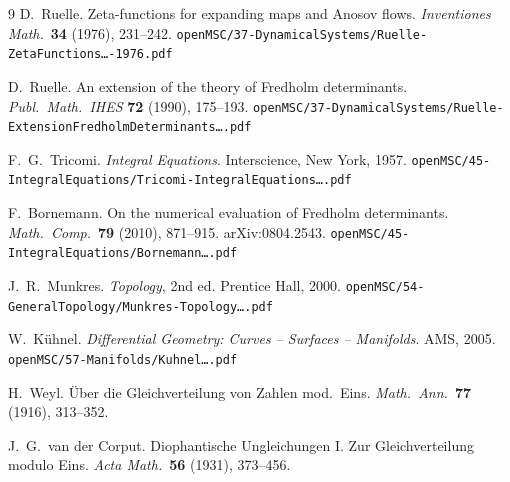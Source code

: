\documentclass[
]{article}
\begin{document}
\begin{thebibliography}{9}
D.~Ruelle.
Zeta-functions for expanding maps and Anosov flows.
\textit{Inventiones Math.}\ \textbf{34} (1976), 231--242.
\texttt{openMSC/37-DynamicalSystems/Ruelle-ZetaFunctions\ldots-1976.pdf}

D.~Ruelle.
An extension of the theory of Fredholm determinants.
\textit{Publ.\ Math.\ IHES} \textbf{72} (1990), 175--193.
\texttt{openMSC/37-DynamicalSystems/Ruelle-ExtensionFredholmDeterminants\ldots.pdf}

F.~G.~Tricomi.
\textit{Integral Equations}.
Interscience, New York, 1957.
\texttt{openMSC/45-IntegralEquations/Tricomi-IntegralEquations\ldots.pdf}

F.~Bornemann.
On the numerical evaluation of Fredholm determinants.
\textit{Math.\ Comp.}\ \textbf{79} (2010), 871--915.
arXiv:0804.2543.
\texttt{openMSC/45-IntegralEquations/Bornemann\ldots.pdf}

J.~R.~Munkres.
\textit{Topology}, 2nd ed.
Prentice Hall, 2000.
\texttt{openMSC/54-GeneralTopology/Munkres-Topology\ldots.pdf}

W.~K\"uhnel.
\textit{Differential Geometry: Curves -- Surfaces -- Manifolds}.
AMS, 2005.
\texttt{openMSC/57-Manifolds/Kuhnel\ldots.pdf}

H.~Weyl.
\"Uber die Gleichverteilung von Zahlen mod.\ Eins.
\textit{Math.\ Ann.}\ \textbf{77} (1916), 313--352.

J.~G.~van der Corput.
Diophantische Ungleichungen I. Zur Gleichverteilung modulo Eins.
\textit{Acta Math.}\ \textbf{56} (1931), 373--456.

\end{thebibliography}
\end{document}
